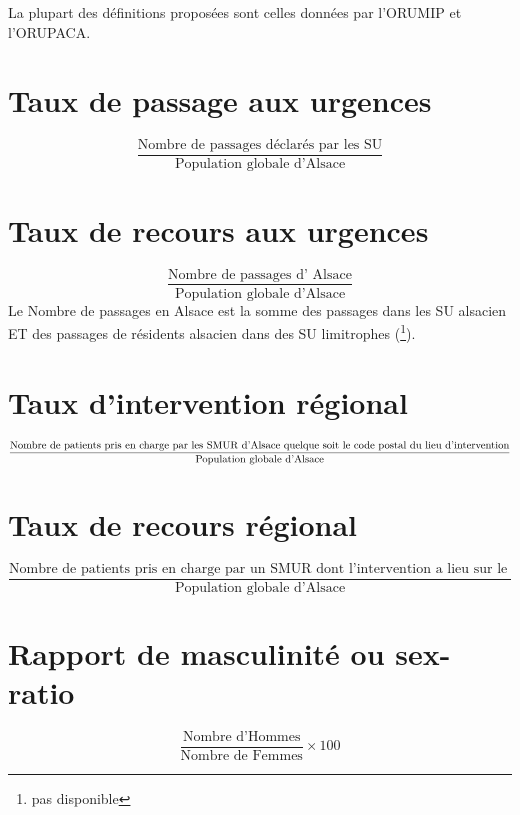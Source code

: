 \documentclass[12pt,english,french,twoside]{book}\usepackage[]{graphicx}\usepackage[]{color}
\begin{document}

La plupart des définitions proposées sont celles données par l'ORUMIP et l'ORUPACA.

\section*{Taux de passage aux urgences}
  \begin{displaymath}
    \frac{\text{Nombre de passages déclarés par les SU}}{\text{Population globale d'Alsace}}
  \end{displaymath}

\section*{Taux de recours aux urgences}
\begin{displaymath}
    \frac{\text{Nombre de passages d' Alsace}}{\text{Population globale d'Alsace}}
  \end{displaymath}
Le Nombre de passages en Alsace est la somme des passages dans les SU alsacien ET des passages de résidents alsacien dans des SU limitrophes (\footnote{pas disponible}).

\section*{Taux d'intervention régional}
\begin{displaymath}
    \frac{\text{Nombre de patients pris en charge par les SMUR d'Alsace}\linebreak[4] \text{ quelque soit le code postal du lieu d'intervention}}{\text{Population globale d'Alsace}}
  \end{displaymath}

\section*{Taux de recours régional}
\begin{displaymath}
    \frac{\text{Nombre de patients pris en charge par un SMUR dont l'intervention a lieu sur le territoire régional }}{\text{Population globale d'Alsace}}
  \end{displaymath}

\section*{Rapport de masculinité ou sex-ratio}
\begin{displaymath}
    \frac{\text{Nombre d'Hommes}}{\text{Nombre de Femmes}} \times 100
\end{displaymath}
\end{document}

